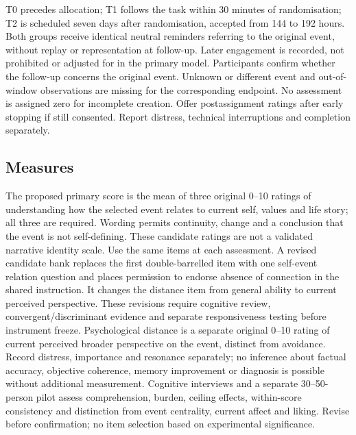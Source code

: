 \documentclass[11pt,a4paper]{article}
\begin{document}
\par T0 precedes allocation; T1 follows the task within 30 minutes of randomisation; T2 is scheduled seven days after randomisation, accepted from 144 to 192 hours. Both groups receive identical neutral reminders referring to the original event, without replay or representation at follow-up. Later engagement is recorded, not prohibited or adjusted for in the primary model. Participants confirm whether the follow-up concerns the original event. Unknown or different event and out-of-window observations are missing for the corresponding endpoint. No assessment is assigned zero for incomplete creation. Offer postassignment ratings after early stopping if still consented. Report distress, technical interruptions and completion separately.
\subsection{Measures}
The proposed primary score is the mean of three original 0--10 ratings of understanding how the selected event relates to current self, values and life story; all three are required. Wording permits continuity, change and a conclusion that the event is not self-defining. These candidate ratings are not a validated narrative identity scale. Use the same items at each assessment. A revised candidate bank replaces the first double-barrelled item with one self-event relation question and places permission to endorse absence of connection in the shared instruction. It changes the distance item from general ability to current perceived perspective. These revisions require cognitive review, convergent/discriminant evidence and separate responsiveness testing before instrument freeze. Psychological distance is a separate original 0--10 rating of current perceived broader perspective on the event, distinct from avoidance. Record distress, importance and resonance separately; no inference about factual accuracy, objective coherence, memory improvement or diagnosis is possible without additional measurement. Cognitive interviews and a separate 30--50-person pilot assess comprehension, burden, ceiling effects, within-score consistency and distinction from event centrality, current affect and liking. Revise before confirmation; no item selection based on experimental significance.
\end{document}
